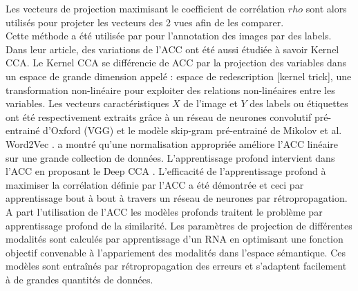 Les vecteurs de projection maximisant le coefficient de corrélation $rho$  sont  alors utilisés pour projeter les vecteurs des 2 vues afin de les comparer.\\
Cette méthode a été utilisée par \cite{murthy2015automatic} pour l'annotation des images par des labels. Dans leur article, des variations de l'ACC ont été aussi étudiée à savoir  Kernel CCA. Le Kernel CCA se différencie de ACC par la projection  des variables dans un espace de grande dimension appelé : espace de redescription [kernel trick], une transformation non-linéaire pour exploiter des relations non-linéaires entre les variables. Les vecteurs caractéristiques $X$ de l'image et $Y$ des labels ou étiquettes ont été respectivement extraits grâce à un réseau de neurones convolutif pré-entrainé d'Oxford (VGG) et le modèle skip-gram pré-entrainé de Mikolov et al. Word2Vec \cite{mikolov2013efficient}. \cite{gong2014improving}  \cite{gong2014multi}  a montré qu'une normalisation appropriée améliore l'ACC linéaire sur une grande collection de données.
L'apprentissage profond intervient dans l'ACC en proposant le Deep CCA \cite{mikolajczyk2015deep}. L'efficacité de l'apprentissage profond à maximiser la corrélation définie par l'ACC a été démontrée et ceci par apprentissage bout à bout à travers un réseau de neurones par rétropropagation.
\medskip
\\

A part l'utilisation de l'ACC les modèles profonds traitent le problème par apprentissage profond de la similarité. Les paramètres de projection de différentes modalités sont calculés par apprentissage d'un RNA en optimisant une fonction objectif convenable à l'appariement des modalités dans l'espace sémantique. Ces modèles sont entraînés par rétropropagation des erreurs et  s'adaptent facilement à de grandes quantités de données.\\

